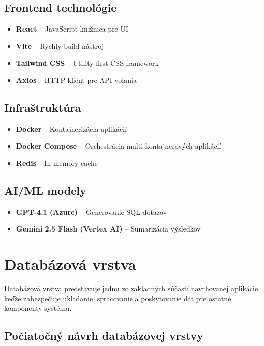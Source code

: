 \documentclass[a4paper, 12pt]{article}
\begin{document}
\subsection{Frontend technológie}

\begin{itemize}
    \item \textbf{React} -- JavaScript knižnica pre UI
    \item \textbf{Vite} -- Rýchly build nástroj
    \item \textbf{Tailwind CSS} -- Utility-first CSS framework
    \item \textbf{Axios} -- HTTP klient pre API volania
\end{itemize}

\subsection{Infraštruktúra}

\begin{itemize}
    \item \textbf{Docker} -- Kontajnerizácia aplikácií
    \item \textbf{Docker Compose} -- Orchestrácia multi-kontajnerových aplikácií
    \item \textbf{Redis} -- In-memory cache
\end{itemize}

\subsection{AI/ML modely}

\begin{itemize}
    \item \textbf{GPT-4.1 (Azure)} -- Generovanie SQL dotazov
    \item \textbf{Gemini 2.5 Flash (Vertex AI)} -- Sumarizácia výsledkov
\end{itemize}

\clearpage
\section{Databázová vrstva}
Databázová vrstva predstavuje jednu zo základných súčastí navrhovanej aplikácie, keďže zabezpečuje ukladanie, spracovanie a poskytovanie dát pre ostatné komponenty systému. 

\subsection{Počiatočný návrh databázovej vrstvy}
\end{document}
